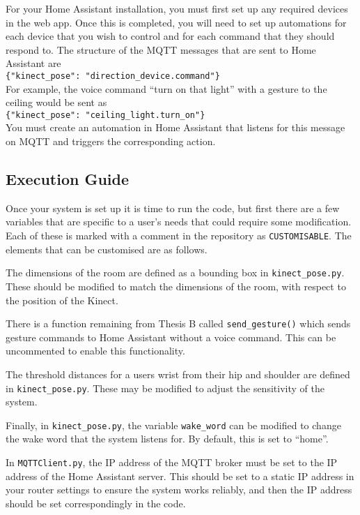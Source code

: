For your Home Assistant installation, you must first set up any required devices in the web app.
Once this is completed, you will need to set up automations for each device that you wish to control and for each command that they should respond to.
The structure of the MQTT messages that are sent to Home Assistant are\\
\texttt{\{"kinect\_pose": "direction\_device.command"\}}\\
For example, the voice command ``turn on that light'' with a gesture to the ceiling would be sent as\\
\texttt{\{"kinect\_pose": "ceiling\_light.turn\_on"\}}\\
You must create an automation in Home Assistant that listens for this message on MQTT and triggers the corresponding action.

\subsection{Execution Guide}
Once your system is set up it is time to run the code, but first there are a few variables that are specific to a user's needs that could require some modification.
Each of these is marked with a comment in the repository as \texttt{CUSTOMISABLE}.
The elements that can be customised are as follows.

The dimensions of the room are defined as a bounding box in \texttt{kinect\_pose.py}.
These should be modified to match the dimensions of the room, with respect to the position of the Kinect.

There is a function remaining from Thesis B called \texttt{send\_gesture()} which sends gesture commands to Home Assistant without a voice command.
This can be uncommented to enable this functionality.

The threshold distances for a users wrist from their hip and shoulder are defined in \texttt{kinect\_pose.py}.
These may be modified to adjust the sensitivity of the system.

Finally, in \texttt{kinect\_pose.py}, the variable \texttt{wake\_word} can be modified to change the wake word that the system listens for.
By default, this is set to ``home''.

In \texttt{MQTTClient.py}, the IP address of the MQTT broker must be set to the IP address of the Home Assistant server.
This should be set to a static IP address in your router settings to ensure the system works reliably, and then the IP address should be set correspondingly in the code.

